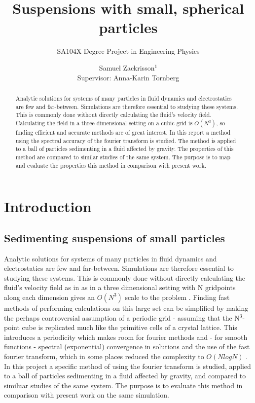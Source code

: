 \documentclass[a4paper,
twoside=false,abstract=false,numbers=noenddot,
titlepage=false,headings=small,parskip=half,version=last]{scrartcl}
\title{Suspensions with small, spherical particles}
\subtitle{SA104X Degree Project in Engineering Physics}
\author[2]{Samuel Zackrisson$^1$ \\ \footnotesize Supervisor: Anna-Karin Tornberg}
\affil[1,2]{Department for Numerical Analysis, Royal Institute of Technology}
\affil[1]{samuelz@kth.se}
\affil[2]{akto@kth.se}
\begin{document}
\maketitle
\thispagestyle{empty}

\begin{abstract}
Analytic solutions for systems of many particles in fluid dynamics and electrostatics are few and far-between.
Simulations are therefore essential to studying these systems.
This is commonly done without directly calculating the fluid's velocity field.
Calculating the field in a three dimensional setting on a cubic grid is $O(N^3)$, so finding efficient and accurate methods are of great interest.
In this report a method using the spectral accuracy of the fourier transform is studied.
The method is applied to a ball of particles sedimenting in a fluid affected by gravity.
The properties of this method are compared to similar studies of the same system.
The purpose is to map and evaluate the properties this method in comparison with present work.
\end{abstract}

\tableofcontents

\section{Introduction}
\subsection{Sedimenting suspensions of small particles}
Analytic solutions for systems of many particles in fluid dynamics and electrostatics are few and far-between. Simulations are therefore essential to studying these systems. This is commonly done without directly calculating the fluid's velocity field as in as in a three dimensional setting with N gridpoints along each dimension gives an $O(N^3)$ scale to the problem \cite{fallingclouds}. Finding fast methods of performing calculations on this large set can be simplified by making the perhaps controversial assumption of a periodic grid - assuming that the N$^3$-point cube is replicated much like the primitive cells of a crystal lattice. This introduces a periodicity which makes room for fourier methods and - for smooth functions - spectral (exponential) convergence in solutions and the use of the fast fourier transform, which in some places reduced the complexity to $O(NlogN)$ \cite{fluctuatesediment}. In this project a specific method of using the fourier transform is studied, applied to a ball of particles sedimenting in a fluid affected by gravity, and compared to similuar studies of the same system. The purpose is to evaluate this method in comparison with present work on the same simulation.
\end{document}
